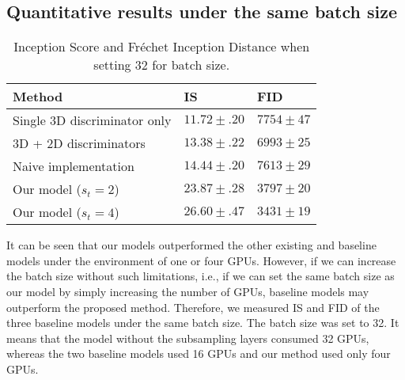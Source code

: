 \documentclass[twocolumn]{svjour3}
\begin{document}
\subsection{Quantitative results under the same batch size}
\label{sec:exp_comparison_same_bs}
\begin{table}[t]
\centering
{\renewcommand{\arraystretch}{1.2}
\begin{tabular}{lll}
Method & IS & FID \\ \hline \hline
Single 3D discriminator only & $11.72 \pm .20$ & $7754 \pm 47$ \\
3D + 2D discriminators & $13.38 \pm .22$ & $6993 \pm 25$ \\
Naive implementation & $14.44 \pm .20$ & $7613 \pm 29$ \\ \hline
Our model ($s_t = 2$) & $23.87 \pm .28$ & $3797 \pm 20$ \\
Our model ($s_t = 4$) & $26.60 \pm .47$ & $3431 \pm 19$ \\ \hline
\end{tabular}
}
\caption{Inception Score and Fr\'echet Inception Distance when setting 32 for batch size.}
\label{table:is_bs_32}
\vspace{-10pt}
\end{table}











It can be seen that our models outperformed the other existing and baseline models
under the environment of one or four GPUs.
However, if we can increase the batch size without such limitations,
i.e., if we can set the same batch size as our model by simply increasing the number of GPUs,
baseline models may outperform the proposed method.
Therefore, we measured IS and FID of the three baseline models under the same batch size.
The batch size was set to 32. It means that the model without the subsampling layers consumed 32 GPUs, whereas the two baseline models used 16 GPUs and our method used only four GPUs.
\end{document}
